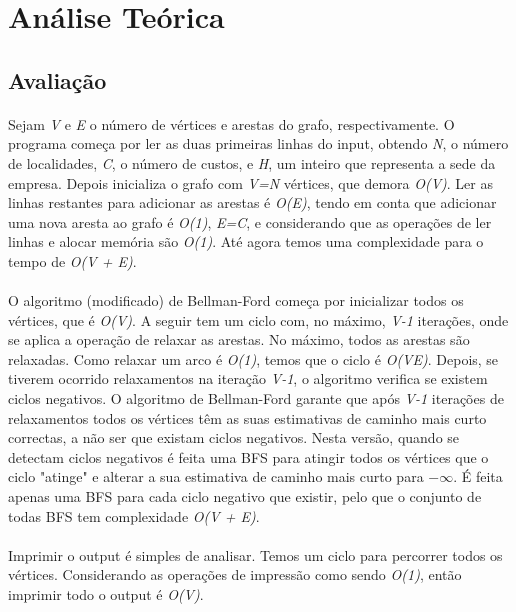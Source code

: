 \documentclass[12pt, a4paper]{article}
\begin{document}
\section{Análise Teórica}
\subsection{Avaliação}
\paragraph{}
Sejam \textit{V} e \textit{E} o número de vértices e arestas do grafo,
respectivamente.  O programa começa por ler as duas primeiras linhas do input,
obtendo \textit{N}, o número de localidades, \textit{C}, o número de custos, e
\textit{H}, um inteiro que representa a sede da empresa. Depois inicializa o
grafo com \textit{V=N} vértices, que demora \textit{O(V)}. Ler as linhas
restantes para adicionar as arestas é \textit{O(E)}, tendo em conta que
adicionar uma nova aresta ao grafo é \textit{O(1)}, \textit{E=C}, e considerando
que as operações de ler linhas e alocar memória são \textit{O(1)}. Até agora
temos uma complexidade para o tempo de \textit{O(V + E)}.

\paragraph{}
O algoritmo (modificado) de Bellman-Ford começa por inicializar todos os
vértices, que é \textit{O(V)}. A seguir tem um ciclo com, no máximo,
\textit{V-1} iterações, onde se aplica a operação de relaxar as arestas. No
máximo, todos as arestas são relaxadas. Como relaxar um arco é \textit{O(1)},
temos que o ciclo é \textit{O(VE)}. Depois, se tiverem ocorrido relaxamentos na
iteração \textit{V-1}, o algoritmo verifica se existem ciclos negativos. O
algoritmo de Bellman-Ford garante que após \textit{V-1} iterações de
relaxamentos todos os vértices têm as suas estimativas de caminho mais curto
correctas, a não ser que existam ciclos negativos. Nesta versão, quando se
detectam ciclos negativos é feita uma BFS para atingir todos os vértices que o
ciclo "atinge" e alterar a sua estimativa de caminho mais curto para
$-\infty$. É feita apenas uma BFS para cada ciclo negativo que existir, pelo que
o conjunto de todas BFS tem complexidade \textit{O(V + E)}.

\paragraph{}
Imprimir o output é simples de analisar. Temos um ciclo para percorrer todos os
vértices. Considerando as operações de impressão como sendo \textit{O(1)}, então
imprimir todo o output é \textit{O(V)}.
\end{document}
